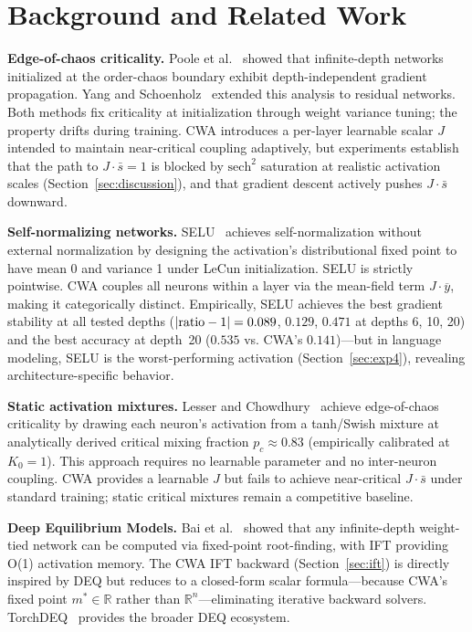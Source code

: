 \documentclass[11pt,twocolumn,letterpaper]{article}
\begin{document}
\section{Background and Related Work}

\textbf{Edge-of-chaos criticality.} Poole et al.~\cite{Poole2016} showed that infinite-depth networks initialized at the
order-chaos boundary exhibit depth-independent gradient propagation. Yang and Schoenholz~\cite{Yang2017} extended this analysis
to residual networks. Both methods fix criticality at initialization through weight variance tuning; the property drifts
during training. CWA introduces a per-layer learnable scalar $J$ intended to maintain near-critical coupling adaptively,
but experiments establish that the path to $J\cdot\bar{s} = 1$ is blocked by $\text{sech}^2$ saturation at realistic
activation scales (Section~\ref{sec:discussion}), and that gradient descent actively pushes $J\cdot\bar{s}$ downward.

\textbf{Self-normalizing networks.} SELU~\cite{Klambauer2017} achieves self-normalization without external normalization by
designing the activation's distributional fixed point to have mean 0 and variance 1 under LeCun initialization. SELU is
strictly pointwise. CWA couples all neurons within a layer via the mean-field term $J\cdot\overline{y}$, making it
categorically distinct. Empirically, SELU achieves the best gradient stability at all tested depths
($|{\rm ratio}-1| = 0.089$, $0.129$, $0.471$ at depths 6, 10, 20) and the best accuracy at depth~20 ($0.535$ vs. CWA's
$0.141$)---but in language modeling, SELU is the worst-performing activation (Section~\ref{sec:exp4}), revealing
architecture-specific behavior.

\textbf{Static activation mixtures.} Lesser and Chowdhury~\cite{Lesser2026} achieve edge-of-chaos criticality by drawing
each neuron's activation from a tanh/Swish mixture at analytically derived critical mixing fraction $p_c \approx 0.83$
(empirically calibrated at $K_0 = 1$). This approach requires no learnable parameter and no inter-neuron coupling. CWA
provides a learnable $J$ but fails to achieve near-critical $J\cdot\bar{s}$ under standard training; static critical
mixtures remain a competitive baseline.

\textbf{Deep Equilibrium Models.} Bai et al.~\cite{Bai2019} showed that any infinite-depth weight-tied network can be
computed via fixed-point root-finding, with IFT providing O(1) activation memory. The CWA IFT backward
(Section~\ref{sec:ift}) is directly inspired by DEQ but reduces to a closed-form scalar formula---because CWA's fixed
point $m^* \in \mathbb{R}$ rather than $\mathbb{R}^n$---eliminating iterative backward solvers. TorchDEQ~\cite{Geng2023}
provides the broader DEQ ecosystem.
\end{document}
